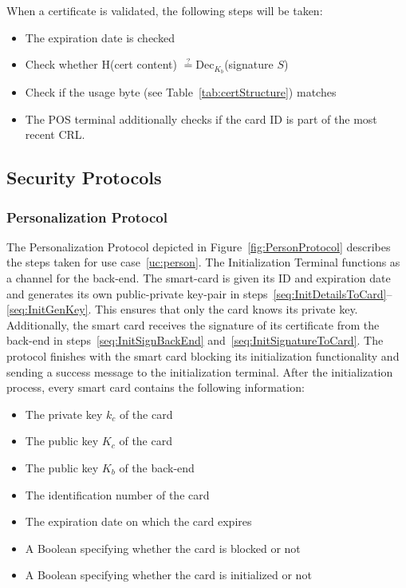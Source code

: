 When a certificate is validated, the following steps will be taken:
\begin{itemize}
    \item The expiration date is checked
    \item Check whether H(cert content) $\stackrel{?}{=} \textrm{Dec}_{K_b}$(signature $S$)
    \item Check if the usage byte (see Table~\ref{tab:certStructure}) matches
    \item The POS terminal additionally checks if the card ID is part of the most recent CRL\@.
\end{itemize}


\subsection{Security Protocols}

\subsubsection{Personalization Protocol} \label{sec:perProtocol}
The Personalization Protocol depicted in Figure~\ref{fig:PersonProtocol} describes the steps taken for use case~\ref{uc:person}.
The Initialization Terminal functions as a channel for the back-end. 
The smart-card is given its ID and expiration date and generates its own public-private key-pair in steps~\ref{seq:InitDetailsToCard}--\ref{seq:InitGenKey}.
This ensures that only the card knows its private key. 
Additionally, the smart card receives the signature of its certificate from the back-end in steps~\ref{seq:InitSignBackEnd} and~\ref{seq:InitSignatureToCard}.
The protocol finishes with the smart card blocking its initialization functionality and sending a success message to the initialization terminal. 
After the initialization process, every smart card contains the following information:
\begin{itemize}
    \item The private key $k_c$ of the card
    \item The public key $K_c$ of the card
    \item The public key $K_b$ of the back-end
    \item The identification number of the card
    \item The expiration date on which the card expires
    \item A Boolean specifying whether the card is blocked or not
    \item A Boolean specifying whether the card is initialized or not
\end{itemize}

